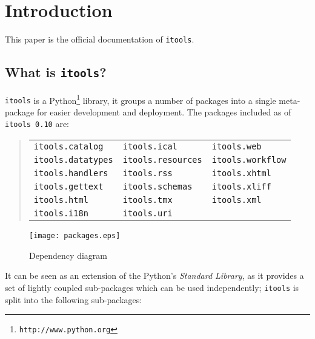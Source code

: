 \chapter{Introduction}

This paper is the official documentation of {\tt itools}.

\section{What is {\tt itools}?}

{\tt itools} is a Python\footnote{\tt http://www.python.org} library, it
groups a number of packages into a single meta-package for easier
development and deployment. The packages included as of {\tt itools 0.10}
are:

\begin{quote}
\begin{tabular}{lll}
  {\tt itools.catalog} & {\tt itools.ical} & {\tt itools.web} \\
  {\tt itools.datatypes} & {\tt itools.resources} & {\tt itools.workflow} \\
  {\tt itools.handlers} & {\tt itools.rss} & {\tt itools.xhtml} \\
  {\tt itools.gettext} & {\tt itools.schemas} & {\tt itools.xliff} \\
  {\tt itools.html} & {\tt itools.tmx} & {\tt itools.xml} \\
  {\tt itools.i18n} & {\tt itools.uri} & \\
\end{tabular}
\end{quote}


\begin{figure}
  \center
  \texttt{[image: packages.eps]}
  \caption{Dependency diagram}
  \label{Figure: packages}
\end{figure}


It can be seen as an extension of the Python's {\em Standard Library},
as it provides a set of lightly coupled sub-packages which can be used
independently; {\tt itools} is split into the following sub-packages:



